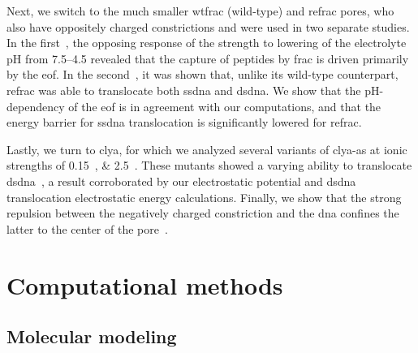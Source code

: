 Next, we switch to the much smaller \gls{wtfrac} (wild-type) and \gls{refrac} pores, who also have oppositely
charged constrictions and were used in two separate studies. In the first~\cite{Huang-2017}, the opposing
response of the  strength to lowering of the electrolyte pH from \numrange{7.5}{4.5} revealed
that the capture of peptides by \gls{frac} is driven primarily by the \gls{eof}. In the
second~\cite{Wloka-2016}, it was shown that, unlike its wild-type counterpart, \gls{refrac} was able to
translocate both \gls{ssdna} and \gls{dsdna}. We show that the pH-dependency of the \gls{eof} is in agreement
with our computations, and that the energy barrier for \gls{ssdna} translocation is significantly lowered for
\gls{refrac}.

Lastly, we turn to \gls{clya}, for which we analyzed several variants of \gls{clya-as} at ionic strengths of
\SIlist{0.15;2.5}{\Molar}. These mutants showed a varying ability to translocate
\gls{dsdna}~\cite{Franceschini-2016}, a result corroborated by our electrostatic potential and \gls{dsdna}
translocation electrostatic energy calculations. Finally, we show that the strong repulsion between the
negatively charged constriction and the \gls{dna} confines the latter to the center of the
pore~\cite{Bayoumi-2020}.









%
%
\clearpage
%
%


%
%
\section{Computational methods}
%
\label{sec:elec:methods}
%

\subsection{Molecular modeling}
%
\label{sec:elec:methods:molec}

